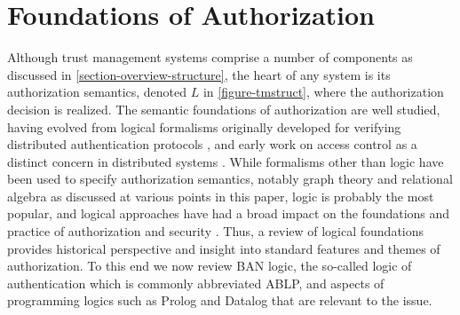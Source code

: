 %
%
%

\section{Foundations of Authorization}
\label{section-foundations}

Although trust management systems comprise a number of components as
discussed in \autoref{section-overview-structure}, the heart of any
system is its authorization semantics, denoted $L$ in
\autoref{figure-tmstruct}, where the authorization decision is
realized. The semantic foundations of authorization are well studied,
having evolved from logical formalisms originally developed for
verifying distributed authentication protocols
\cite{Burrows:LA,Abadi:CACDS}, and early work on access control as a
distinct concern in distributed systems \cite{woo93authorizations}. While
formalisms other than logic have been used to specify authorization
semantics, notably graph theory and relational algebra as discussed at
various points in this paper, logic is probably the most popular, and
logical approaches have had a broad impact on the foundations and
practice of authorization and security \cite{bonatti-logicsforauth}.
Thus, a review of logical foundations provides historical perspective
and insight into standard features and themes of authorization. To
this end we now review BAN \cite{Burrows:LA} logic, the so-called
logic of authentication \cite{Abadi:CACDS} which is commonly
abbreviated ABLP, and aspects of programming logics such as Prolog and
Datalog that are relevant to the issue.

